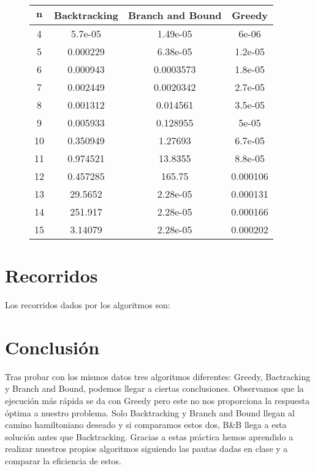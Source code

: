 \documentclass[a4]{article}
\begin{document}
\begin{figure}[H]
  \centering
  \label{tab:tiempos}
  \begin{tabular}{| c | c | c | c |}
    \hline
    \multicolumn{1}{|c|}{$\textbf{n}$}& \textbf{Backtracking}&
    \textbf{Branch and Bound}& \textbf{Greedy} \\ \hline
     4 & 5.7e-05   & 1.49e-05  & 6e-06     \\ 
     5 & 0.000229  & 6.38e-05  & 1.2e-05   \\ 
     6 & 0.000943  & 0.0003573 & 1.8e-05   \\ 
     7 & 0.002449  & 0.0020342 & 2.7e-05   \\ 
     8 & 0.001312  & 0.014561  & 3.5e-05   \\ 
     9 & 0.005933  & 0.128955  & 5e-05     \\ 
    10 & 0.350949  & 1.27693   & 6.7e-05   \\ 
    11 & 0.974521  & 13.8355   & 8.8e-05   \\ 
    12 & 0.457285  & 165.75    & 0.000106  \\
    13 & 29.5652   & 2.28e-05  & 0.000131  \\
    14 & 251.917   & 2.28e-05  & 0.000166  \\
    15 & 3.14079   & 2.28e-05  & 0.000202  \\ \hline
  \end{tabular}
\end{figure}

\section{Recorridos}
Los recorridos dados por los algoritmos son:



\section{Conclusión}
Tras probar con los mismos datos tres algoritmos diferentes: Greedy, Bactracking y Branch and Bound, podemos llegar a ciertas conclusiones. Observamos que la ejecución más rápida se da con Greedy pero este no nos proporciona la respuesta óptima a nuestro problema. Solo Backtracking y Branch and Bound llegan al camino hamiltoniano deseado y si comparamos estos dos, B\&B llega a esta solución antes que Backtracking. Gracias a estas práctica hemos aprendido a realizar nuestros propios algoritmos siguiendo las pautas dadas en clase y a comparar la eficiencia de estos.
\end{document}
